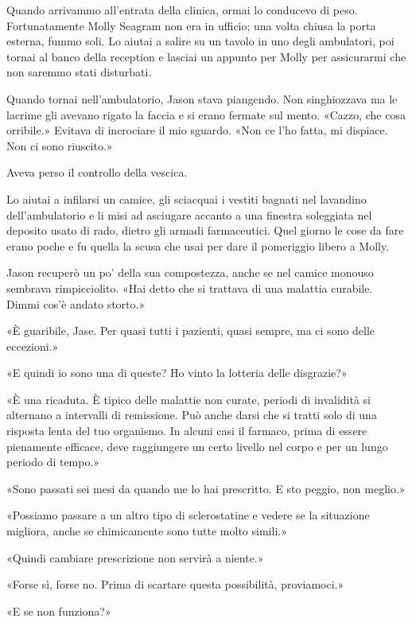 Quando arrivammo all'entrata della clinica, ormai lo conducevo di peso.
Fortunatamente Molly Seagram non era in ufficio; una volta chiusa la
porta esterna, fummo soli. Lo aiutai a salire su un tavolo in uno degli
ambulatori, poi tornai al banco della reception e lasciai un appunto per
Molly per assicurarmi che non saremmo stati disturbati.

Quando tornai nell'ambulatorio, Jason stava piangendo. Non singhiozzava
ma le lacrime gli avevano rigato la faccia e si erano fermate sul mento.
«Cazzo, che cosa orribile.» Evitava di incrociare il mio sguardo. «Non
ce l'ho fatta, mi dispiace. Non ci sono riuscito.»

Aveva perso il controllo della vescica.

\separatorefiori

Lo aiutai a infilarsi un camice, gli sciacquai i vestiti bagnati nel
lavandino dell'ambulatorio e li misi ad asciugare accanto a una finestra
soleggiata nel deposito usato di rado, dietro gli armadi farmaceutici.
Quel giorno le cose da fare erano poche e fu quella la scusa che usai
per dare il pomeriggio libero a Molly.

Jason recuperò un po' della sua compostezza, anche se nel camice monouso
sembrava rimpicciolito. «Hai detto che si trattava di una malattia
curabile. Dimmi cos'è andato storto.»

«È guaribile, Jase. Per quasi tutti i pazienti, quasi sempre, ma ci sono
delle eccezioni.»

«E quindi io sono una di queste? Ho vinto la lotteria delle disgrazie?»

«È una ricaduta. È tipico delle malattie non curate, periodi di
invalidità si alternano a intervalli di remissione. Può anche darsi che
si tratti solo di una risposta lenta del tuo organismo. In alcuni casi
il farmaco, prima di essere pienamente efficace, deve raggiungere un
certo livello nel corpo e per un lungo periodo di tempo.»

«Sono passati sei mesi da quando me lo hai prescritto. E sto peggio, non
meglio.»

«Possiamo passare a un altro tipo di sclerostatine e vedere se la
situazione migliora, anche se chimicamente sono tutte molto simili.»

«Quindi cambiare prescrizione non servirà a niente.»

«Forse sì, forse no. Prima di scartare questa possibilità, proviamoci.»

«E se non funziona?»

